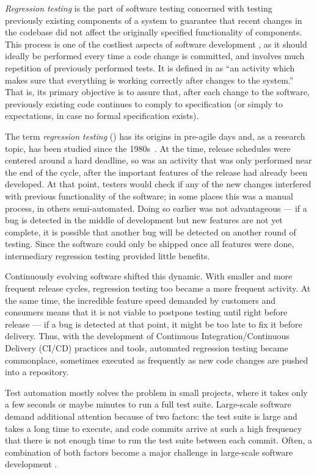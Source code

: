 \textit{Regression testing} is the part of software testing concerned with testing previously existing components of a system to guarantee that recent changes in the codebase did not affect the originally specified functionality of components.
This process is one of the costliest aspects of software development \cite{rothermel_improving_2018}, as it should ideally be performed every time a code change is committed, and involves much repetition of previously performed tests.
It is defined in \cite{minhas_regression_2017} as ``an activity which makes sure that everything is working correctly after changes to the system.''
That is, its primary objective is to assure that, after each change to the software, previously existing code continues to comply to specification (or simply to expectations, in case no formal specification exists).

The term \textit{regression testing} (\rt) has its origins in pre-agile days and, as a research topic, has been studied since the 1980s~\cite{leung1989insights,yoo2012regression}.
At the time, release schedules were centered around a hard deadline, so \rt was an activity that was only performed near the end of the cycle, after the important features of the release had already been developed.
At that point, testers would check if any of the new changes interfered with previous functionality of the software; in some places this was a manual process, in others semi-automated.
Doing so earlier was not advantageous --- if a bug is detected in the middle of development but new features are not yet complete, it is possible that another bug will be detected on another round of testing.
Since the software could only be shipped once all features were done, intermediary regression testing provided little benefits.

Continuously evolving software shifted this dynamic.
With smaller and more frequent release cycles, regression testing too became a more frequent activity.
At the same time, the incredible feature speed demanded by customers and consumers means that it is not viable to postpone testing until right before release --- if a bug is detected at that point, it might be too late to fix it before delivery.
Thus, with the development of Continuous Integration/Continuous Delivery (CI/CD) practices and tools, automated regression testing became commonplace, sometimes executed as frequently as new code changes are pushed into a repository.

Test automation mostly solves the problem in small projects, where it takes only a few seconds or maybe minutes to run a full test suite.
Large-scale software demand additional attention because of two factors: the test suite is large and takes a long time to execute, and code commits arrive at such a high frequency that there is not enough time to run the test suite between each commit.
Often, a combination of both factors become a major challenge in large-scale software development \cite{memon_taming_2017}.

